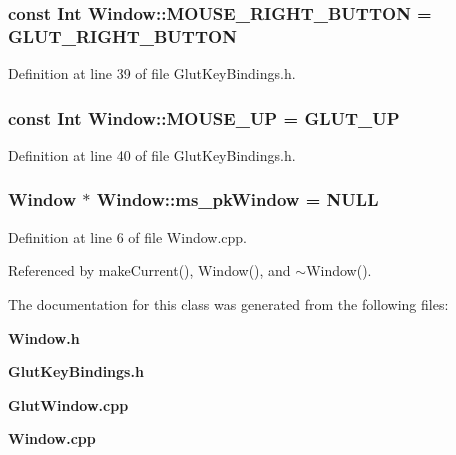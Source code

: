 \subsubsection{\setlength{\rightskip}{0pt plus 5cm}const {\bf Int} Window::MOUSE\_\-RIGHT\_\-BUTTON = GLUT\_\-RIGHT\_\-BUTTON\hspace{0.3cm}{\tt  [static]}}\label{classdg_1_1Window_p29}




Definition at line 39 of file Glut\-Key\-Bindings.h.
\subsubsection{\setlength{\rightskip}{0pt plus 5cm}const {\bf Int} Window::MOUSE\_\-UP = GLUT\_\-UP\hspace{0.3cm}{\tt  [static]}}\label{classdg_1_1Window_p30}




Definition at line 40 of file Glut\-Key\-Bindings.h.
\subsubsection{\setlength{\rightskip}{0pt plus 5cm}Window $\ast$ Window::ms\_\-pk\-Window = NULL\hspace{0.3cm}{\tt  [static, protected]}}\label{classdg_1_1Window_q0}




Definition at line 6 of file Window.cpp.

Referenced by make\-Current(), Window(), and $\sim$Window().

The documentation for this class was generated from the following files:\begin{CompactItemize}
\item 
{\bf Window.h}\item 
{\bf Glut\-Key\-Bindings.h}\item 
{\bf Glut\-Window.cpp}\item 
{\bf Window.cpp}\end{CompactItemize}
